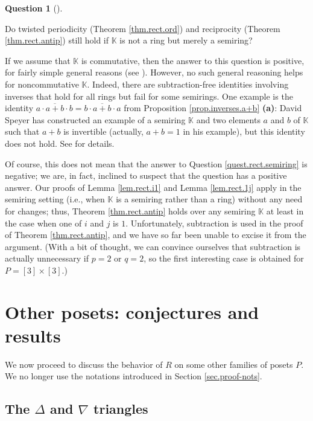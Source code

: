 \documentclass[numbers=enddot,12pt,final,onecolumn,notitlepage]{scrartcl}%
\theoremstyle{definition}
\newtheorem{quest}[theo]{Question}
\newenvironment{question}[1][]
{\begin{quest}[#1]\begin{leftbar}}
{\end{leftbar}\end{quest}}
\newenvironment{question}[1][Question]{\noindent\textbf{#1.} }{\ \rule{0.5em}{0.5em}}
\begin{document}
\begin{question}
\label{quest.rect.semiring}Do twisted periodicity (Theorem \ref{thm.rect.ord})
and reciprocity (Theorem \ref{thm.rect.antip}) still hold if $\mathbb{K}$ is
not a ring but merely a semiring?
\end{question}

If we assume that $\mathbb{K}$ is commutative, then the answer to this
question is positive, for fairly simple general reasons (see \cite[Remark
10]{bir-row-1}). However, no such general reasoning helps for noncommutative
$\mathbb{K}$. Indeed, there are subtraction-free identities involving inverses
that hold for all rings but fail for some semirings. One example is the
identity $a\cdot\overline{a+b}\cdot b=b\cdot\overline{a+b}\cdot a$ from
Proposition \ref{prop.inverses.a+b} \textbf{(a)}: David Speyer has constructed
an example of a semiring $\mathbb{K}$ and two elements $a$ and $b$ of
$\mathbb{K}$ such that $a+b$ is invertible (actually, $a+b=1$ in his example),
but this identity does not hold. See \cite{Speyer21} for details.

Of course, this does not mean that the answer to Question
\ref{quest.rect.semiring} is negative; we are, in fact, inclined to suspect
that the question has a positive answer. Our proofs of Lemma \ref{lem.rect.i1}
and Lemma \ref{lem.rect.1j} apply in the semiring setting (i.e., when
$\mathbb{K}$ is a semiring rather than a ring) without any need for changes;
thus, Theorem \ref{thm.rect.antip} holds over any semiring $\mathbb{K}$ at
least in the case when one of $i$ and $j$ is $1$. Unfortunately, subtraction
is used in the proof of Theorem \ref{thm.rect.antip}, and we have so far been
unable to excise it from the argument. (With a bit of thought, we can convince
ourselves that subtraction is actually unnecessary if $p=2$ or $q=2$, so the
first interesting case is obtained for $P=\left[  3\right]  \times\left[
3\right]  $.)

\section{\label{sec.otherposets}Other posets: conjectures and results}

We now proceed to discuss the behavior of $R$ on some other families of posets
$P$. We no longer use the notations introduced in Section \ref{sec.proof-nots}.

\subsection{The $\Delta$ and $\nabla$ triangles}
\end{document}

